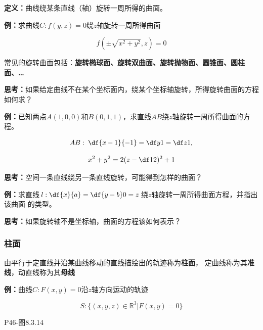 {\bf 定义：}曲线绕某条直线（轴）旋转一周所得的曲面。

{\bf 例：}求曲线$C:f(y,z)=0$绕$z$轴旋转一周所得曲面

$${f(\pm\sqrt{x^2+y^2},z)=0}$$

常见的旋转曲面包括：{\bf 旋转椭球面、旋转双曲面、旋转抛物面、圆锥面、圆柱面、\ldots}

{\bf 思考：}如果给定曲线不在某个坐标面内，绕某个坐标轴旋转，所得旋转曲面的方程如何求？

{\bf 例：}已知两点$A(1,0,0)$和$B(0,1,1)$，求直线$AB$绕$z$轴旋转一周所得曲面的方程。

$$AB:\;\df{x-1}{-1}=\df y1=\df z1,$$

$$x^2+y^2=2(z-\df12)^2+1$$

{\bf 思考：}空间一条直线绕另一条直线旋转，可能得到怎样的曲面？

{\bf 例：}求直线$l:\df{x}{a}=\df{y-b}0=z$绕$z$轴旋转一周所得曲面方程，并指出该曲面
的类型。

{\bf 思考：}如果旋转轴不是坐标轴，曲面的方程该如何表示？

\subsubsection{柱面}

由平行于定直线并沿某曲线移动的直线描绘出的轨迹称为{\bf 柱面}，
定曲线称为其{\bf 准线}，动直线称为其{\bf 母线}

{\bf 例：}曲线$C:F(x,y)=0$沿$z$轴方向运动的轨迹

$${S:\{(x,y,z)\in\mathbb{R}^3|F(x,y)=0\}}$$

\begin{center}
	
	P46-图8.3.14
\end{center}

